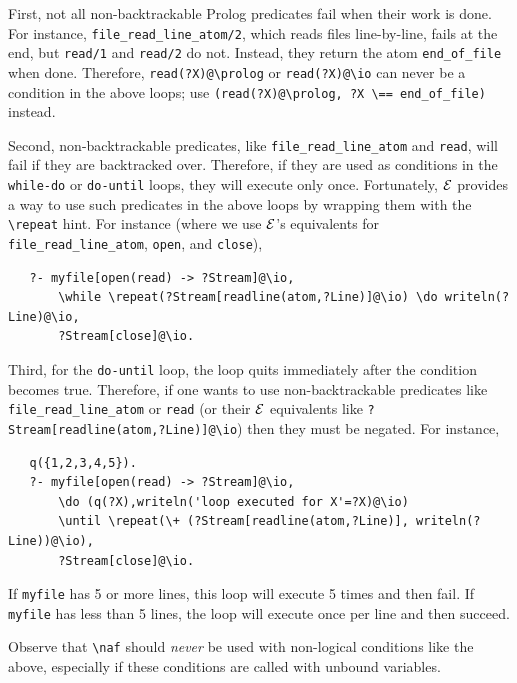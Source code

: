 \documentclass[11pt]{article}
\newcommand{\ERGO}{\mbox{\ensuremath{\cal{E}}\smaller{{\sc{RGO}}}}\xspace}
\newcommand{\FLSYSTEM}{\ERGO}
\newcommand{\bs}{\textbackslash}
\newcommand{\RULELOGNAF}{{\texttt{{\bs}naf}}\xspace}
\begin{document}
First, not all non-backtrackable
Prolog predicates fail when their work is done. For
instance, \texttt{file\_read\_line\_atom/2}, which reads files line-by-line,
fails at the end, but \texttt{read/1} and \texttt{read/2} do not. Instead,
they return the atom \texttt{end\_of\_file} when done. Therefore,
\texttt{read(?X)@\bs{}prolog} or
\texttt{read(?X)@\bs{}io} can never be a condition in the above loops; use
\texttt{(read(?X)@\bs{}prolog, ?X \bs{}== end\_of\_file)} instead.

\index{\bs{}repeat option in do-loops}
Second, non-backtrackable predicates, like
\texttt{file\_read\_line\_atom} and \texttt{read}, 
will fail if they are 
backtracked over. Therefore, if they are used as conditions in
the \texttt{while-do} or \texttt{do-until} loops, they will execute only
once.
Fortunately, \FLSYSTEM provides a way to use such predicates in the above
loops by wrapping them with the \texttt{\bs{}repeat} hint. For instance
(where we use \FLSYSTEM's equivalents for \texttt{file\_read\_line\_atom},
\texttt{open}, and \texttt{close}),
\begin{verbatim}
   ?- myfile[open(read) -> ?Stream]@\io,
       \while \repeat(?Stream[readline(atom,?Line)]@\io) \do writeln(?Line)@\io,
       ?Stream[close]@\io.
\end{verbatim}

Third, for the \texttt{do-until} loop, the loop quits immediately after the
condition becomes true. Therefore, if one wants to use
non-backtrackable predicates like
\texttt{file\_read\_line\_atom} or \texttt{read} (or their \FLSYSTEM
equivalents like
\texttt{?Stream[readline(atom,?Line)]@\bs{}io}) then they must be negated.
For instance,
\begin{verbatim}
   q({1,2,3,4,5}).
   ?- myfile[open(read) -> ?Stream]@\io,
       \do (q(?X),writeln('loop executed for X'=?X)@\io)
       \until \repeat(\+ (?Stream[readline(atom,?Line)], writeln(?Line))@\io),
       ?Stream[close]@\io.
\end{verbatim}
If \texttt{myfile} has 5 or more lines, this loop will execute 5 times and
then fail. If \texttt{myfile} has less than 5 lines, the loop will execute
once per line and then succeed.

Observe that \RULELOGNAF should \emph{never} be used with non-logical
conditions like the above, especially if these conditions are called with
unbound variables.
\end{document}
